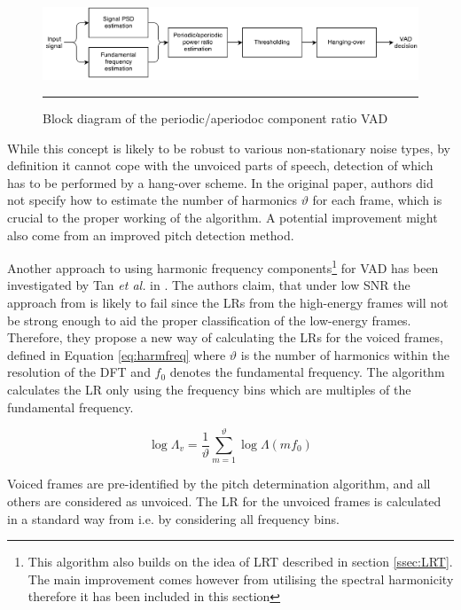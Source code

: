 \begin{figure}[htbp]
	\centering
		\includegraphics[width=0.9\columnwidth]{Figures/PARADE.png}
		\rule{37em}{0.5pt}
	\caption[Block diagram of the periodic/aperiodoc component ratio VAD]{Block diagram of the periodic/aperiodoc component ratio VAD \cite{PARADE}}
	\label{fig:PARADE}
\end{figure}

While this concept is likely to be robust to various non-stationary noise types, by definition it cannot cope with the unvoiced parts of speech, detection of which has to be performed by a hang-over scheme. In the original paper, authors did not specify how to estimate the number of harmonics $\vartheta$ for each frame, which is crucial to the proper working of the algorithm. A potential improvement might also come from an improved pitch detection method.

Another approach to using harmonic frequency components\footnote{This algorithm also builds on the idea of LRT described in section \ref{ssec:LRT}. The main improvement comes however from utilising the spectral harmonicity therefore it has been included in this section} for VAD has been investigated by Tan \emph{et al.} in \cite{Tan}. The authors claim, that under low SNR the approach from \cite{RamirezMulti} is likely to fail since the LRs from the high-energy frames will not be strong enough to aid the proper classification of the low-energy frames. Therefore, they propose a new way of calculating the LRs for the voiced frames, defined in Equation \ref{eq:harmfreq} where $\vartheta$ is the number of harmonics within the resolution of the DFT and $f_0$ denotes the fundamental frequency. The algorithm calculates the LR only using the frequency bins which are multiples of the fundamental frequency.

\begin{equation}
\log \Lambda_v = \frac{1}{\vartheta} \sum_{m=1}^{\vartheta} \log \Lambda(m f_0)
\label{eq:harmfreq}
\end{equation}

Voiced frames are pre-identified by the pitch determination algorithm, and all others are considered as unvoiced. The LR for the unvoiced frames is calculated in a standard way from \cite{SohnInitial} i.e. by considering all frequency bins.

